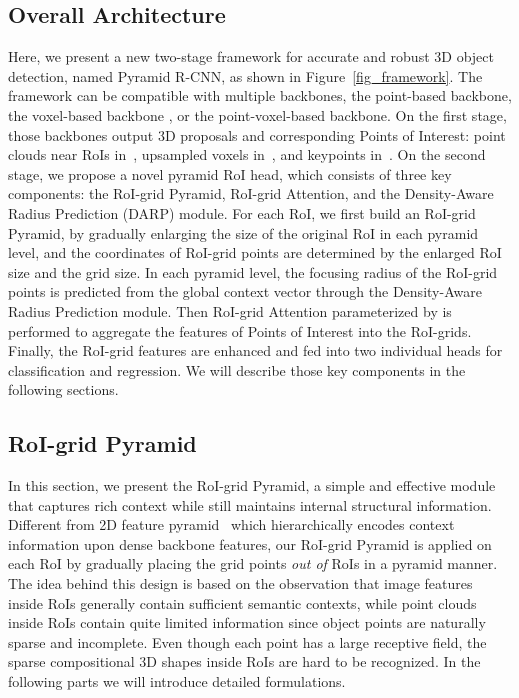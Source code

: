 \documentclass[10pt,twocolumn,letterpaper]{article}
\begin{document}
\subsection{Overall Architecture} \label{Overall Architecture}
Here, we present a new two-stage framework for accurate and robust 3D object detection, named Pyramid R-CNN, as shown in Figure~\ref{fig_framework}. The framework can be compatible with multiple backbones, \eg the point-based backbone, the voxel-based backbone , or the point-voxel-based backbone. On the first stage, those backbones output 3D proposals and corresponding Points of Interest: \eg point clouds near RoIs in~\cite{shi2019pointrcnn}, upsampled voxels in~\cite{shi2020points}, and keypoints in~\cite{shi2020pv}. On the second stage, we propose a novel pyramid RoI head, which consists of three key components: the RoI-grid Pyramid, RoI-grid Attention, and the Density-Aware Radius Prediction (DARP) module. For each RoI, we first build an RoI-grid Pyramid, by gradually enlarging the size of the original RoI in each pyramid level, and the coordinates of RoI-grid points are determined by the enlarged RoI size and the grid size. In each pyramid level, the focusing radius  of the RoI-grid points is predicted from the global context vector through the Density-Aware Radius Prediction module. Then RoI-grid Attention parameterized by  is performed to aggregate the features of Points of Interest into the RoI-grids. Finally, the RoI-grid features are enhanced and fed into two individual heads for classification and regression. We will describe those key components in the following sections.

\subsection{RoI-grid Pyramid} \label{RoI-grid Pyramid}

In this section, we present the RoI-grid Pyramid, a simple and effective module that captures rich context while still maintains internal structural information. Different from 2D feature pyramid~\cite{lin2017feature} which hierarchically encodes context information upon dense backbone features, our RoI-grid Pyramid is applied on each RoI by gradually placing the grid points \textit{out of} RoIs in a pyramid manner. The idea behind this design is based on the observation that image features inside RoIs generally contain sufficient semantic contexts, while point clouds inside RoIs contain quite limited information since object points are naturally sparse and incomplete. Even though each point has a large receptive field, the sparse compositional 3D shapes inside RoIs are hard to be recognized. In the following parts we will introduce detailed formulations.
\end{document}
